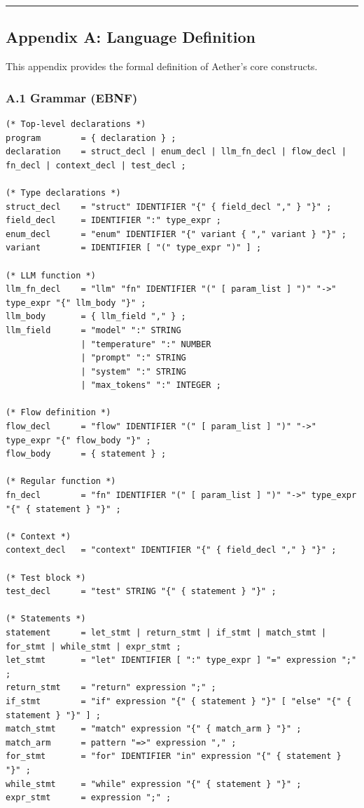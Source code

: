 \documentclass[
]{article}
\begin{document}
\begin{center}\rule{0.5\linewidth}{0.5pt}\end{center}

\subsection{Appendix A: Language
Definition}\label{appendix-a-language-definition}

This appendix provides the formal definition of Aether's core
constructs.

\subsubsection{A.1 Grammar (EBNF)}\label{a.1-grammar-ebnf}

\begin{lstlisting}
(* Top-level declarations *)
program        = { declaration } ;
declaration    = struct_decl | enum_decl | llm_fn_decl | flow_decl | fn_decl | context_decl | test_decl ;

(* Type declarations *)
struct_decl    = "struct" IDENTIFIER "{" { field_decl "," } "}" ;
field_decl     = IDENTIFIER ":" type_expr ;
enum_decl      = "enum" IDENTIFIER "{" variant { "," variant } "}" ;
variant        = IDENTIFIER [ "(" type_expr ")" ] ;

(* LLM function *)
llm_fn_decl    = "llm" "fn" IDENTIFIER "(" [ param_list ] ")" "->" type_expr "{" llm_body "}" ;
llm_body       = { llm_field "," } ;
llm_field      = "model" ":" STRING
               | "temperature" ":" NUMBER
               | "prompt" ":" STRING
               | "system" ":" STRING
               | "max_tokens" ":" INTEGER ;

(* Flow definition *)
flow_decl      = "flow" IDENTIFIER "(" [ param_list ] ")" "->" type_expr "{" flow_body "}" ;
flow_body      = { statement } ;

(* Regular function *)
fn_decl        = "fn" IDENTIFIER "(" [ param_list ] ")" "->" type_expr "{" { statement } "}" ;

(* Context *)
context_decl   = "context" IDENTIFIER "{" { field_decl "," } "}" ;

(* Test block *)
test_decl      = "test" STRING "{" { statement } "}" ;

(* Statements *)
statement      = let_stmt | return_stmt | if_stmt | match_stmt | for_stmt | while_stmt | expr_stmt ;
let_stmt       = "let" IDENTIFIER [ ":" type_expr ] "=" expression ";" ;
return_stmt    = "return" expression ";" ;
if_stmt        = "if" expression "{" { statement } "}" [ "else" "{" { statement } "}" ] ;
match_stmt     = "match" expression "{" { match_arm } "}" ;
match_arm      = pattern "=>" expression "," ;
for_stmt       = "for" IDENTIFIER "in" expression "{" { statement } "}" ;
while_stmt     = "while" expression "{" { statement } "}" ;
expr_stmt      = expression ";" ;


\end{lstlisting}
\end{document}
